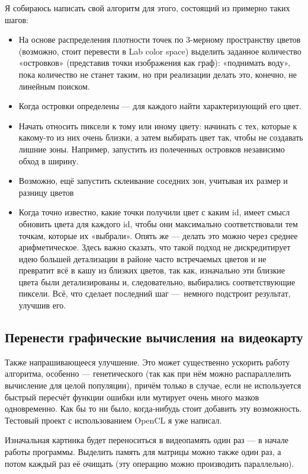 Я собираюсь написать свой алгоритм для этого, состоящий из примерно таких шагов:
\begin{itemize}
    \item На основе распределения плотности точек по 3-мерному пространству цветов (возможно, стоит перевести в Lab color space) выделить заданное количество «островков» (представив точки изображения как граф):
    «поднимать воду», пока количество не станет таким, но при реализации делать это, конечно, не линейным поиском.
    \item Когда островки определены — для каждого найти характеризующий его цвет.
    \item Начать относить пиксели к тому или иному цвету: начинать с тех, которые к какому-то из них очень близки, а затем выбирать цвет так, чтобы не создавать лишние зоны.
    Например, запустить из полеченных островков независимо обход в ширину.
    \item Возможно, ещё запустить склеивание соседних зон, учитывая их размер и разницу цветов
    \item Когда точно известно, какие точки получили цвет с каким id, имеет смысл обновить цвета для каждого id,
    чтобы они максимально соответствовали тем точкам, которые их «выбрали».
    Опять же — делать это можно через среднее арифметическое.
    Здесь важно сказать, что такой подход не дискредитирует идею большей детализации в районе часто встречаемых цветов
    и не превратит всё в кашу из близких цветов, так как, изначально эти близкие цвета были детализированы и, следовательно, выбирались соответствующие пиксели.
    Всё, что сделает последний шаг — немного подстроит результат, улучшив его.
\end{itemize}


\subsection{Перенести графические вычисления на видеокарту}\label{subsec:move_graphics_to_videocard}
Также напрашивающееся улучшение.
Это может существенно ускорить работу алгоритма, особенно — генетического (так как при нём можно распараллелить вычисление для целой популяции),
причём только в случае, если не используется быстрый пересчёт функции ошибки или мутирует очень много мазков одновременно.
Как бы то ни было, когда-нибудь стоит добавить эту возможность.
Тестовый проект с использованием OpenCL я уже написал.

Изначальная картинка будет переноситься в видеопамять один раз — в начале работы программы.
Выделить память для матрицы можно также один раз, а потом каждый раз её очищать (эту операцию можно производить параллельно).

